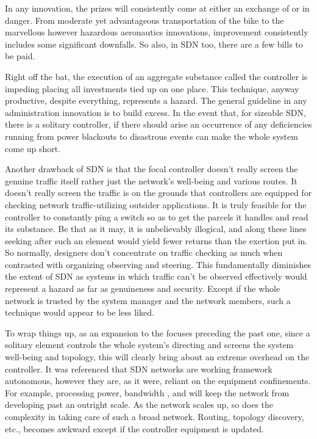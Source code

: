 In any innovation, the prizes will consistently come at either an exchange of or in danger. From moderate yet advantageous transportation of the bike to the marvellous however hazardous aeronautics innovations, improvement consistently includes some significant downfalls. So also, in SDN too, there are a few bills to be paid. 

Right off the bat, the execution of an aggregate substance called the controller is impeding placing all investments tied up on one place. This technique, anyway productive, despite everything, represents a hazard. The general guideline in any administration innovation is to build excess. In the event that, for sizeable SDN, there is a solitary controller, if there should arise an occurrence of any deficiencies running from power blackouts to disastrous events can make the whole system come up short.

    Another drawback of SDN is that the focal controller doesn't really screen the genuine traffic itself rather just the network's well-being and various routes. It doesn't really screen the traffic is on the grounds that controllers are equipped for checking network traffic-utilizing outsider applications. It is truly feasible for the controller to constantly ping a switch so as to get the parcels it handles and read its substance. Be that as it may, it is unbelievably illogical, and along these lines seeking after such an element would yield fewer returns than the exertion put in. So normally, designers don't concentrate on traffic checking as much when contrasted with organizing observing and steering. This fundamentally diminishes the extent of SDN as systems in which traffic can't be observed effectively would represent a hazard as far as genuineness and security. Except if the whole network is trusted by the system manager and the network members, such a technique would appear to be less liked.
    
    To wrap things up, as an expansion to the focuses preceding the past one, since a solitary element controls the whole system's directing and screens the system well-being and topology, this will clearly bring about an extreme overhead on the controller. It was referenced that SDN networks are working framework autonomous, however they are, as it were, reliant on the equipment confinements. For example, processing power, bandwidth , and will keep the network from developing past an outright scale. As the network scales up, so does the complexity in taking care of such a broad network. Routing, topology discovery, etc., becomes awkward except if the controller equipment is updated.\cite{netflow2004}
    
